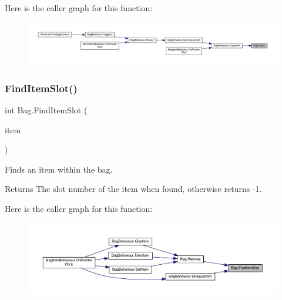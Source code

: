 Here is the caller graph for this function\+:
\nopagebreak
\begin{figure}[H]
\begin{center}
\leavevmode
\includegraphics[width=350pt]{class_bag_a975e4ef7a5647327225e5b587b32c066_icgraph}
\end{center}
\end{figure}
\mbox{\label{class_bag_a0f77c6c4e4e4782d81256fa81e7d18f4}} 
\subsubsection{\texorpdfstring{FindItemSlot()}{FindItemSlot()}}
{\footnotesize\ttfamily int Bag.\+Find\+Item\+Slot (\begin{DoxyParamCaption}\item[{\mbox{\hyperlink{class_base_item}{Base\+Item}}}]{item }\end{DoxyParamCaption})}



Finds an item within the bag. 

\begin{DoxyReturn}{Returns}
The slot number of the item when found, otherwise returns -\/1.
\end{DoxyReturn}
Here is the caller graph for this function\+:
\nopagebreak
\begin{figure}[H]
\begin{center}
\leavevmode
\includegraphics[width=350pt]{class_bag_a0f77c6c4e4e4782d81256fa81e7d18f4_icgraph}
\end{center}
\end{figure}
\mbox{\label{class_bag_a089ef28af0c9fe39cc430b1826a313a7}} 
